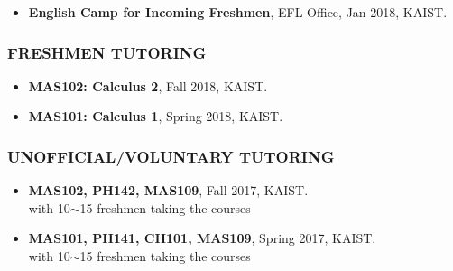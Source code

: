 \documentclass[10pt,a4]{article}
\begin{document}
\begin{small}
\begin{itemize}
\item {\bf English Camp for Incoming Freshmen}, EFL Office, Jan 2018, KAIST.

\end{itemize}

\subsubsection*{FRESHMEN TUTORING}
\begin{itemize}

\item {\bf MAS102: Calculus 2}, Fall 2018, KAIST.

\item {\bf MAS101: Calculus 1}, Spring 2018, KAIST.

\end{itemize}

\subsubsection*{UNOFFICIAL/VOLUNTARY TUTORING}
\begin{itemize}

\item {\bf MAS102, PH142, MAS109}, Fall 2017, KAIST. \\
with 10$\sim$15 freshmen taking the courses

\item {\bf MAS101, PH141, CH101, MAS109}, Spring 2017, KAIST. \\
with 10$\sim$15 freshmen taking the courses


\end{itemize}






\end{small}
\end{document}
